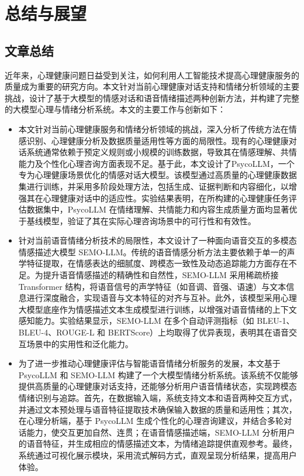 
\chapter{总结与展望}

\section{文章总结}

近年来，心理健康问题日益受到关注，如何利用人工智能技术提高心理健康服务的质量成为重要的研究方向。本文针对当前心理健康对话支持和情绪分析领域的主要挑战，设计了基于大模型的情感对话和语音情绪描述两种创新方法，并构建了完整的大模型心理与情绪分析系统。本文的主要工作与创新如下：

\begin{itemize}
  \item 本文针对当前心理健康服务和情绪分析领域的挑战，深入分析了传统方法在情感识别、心理健康分析及数据质量适用性等方面的局限性。现有的心理健康对话系统通常依赖于预定义规则或小规模的训练数据，导致其在情感理解、共情能力及个性化心理咨询方面表现不足。基于此，本文设计了PsycoLLM，一个专为心理健康场景优化的情感对话大模型。该模型通过高质量的心理健康数据集进行训练，并采用多阶段处理方法，包括生成、证据判断和内容细化，以增强其在心理健康对话中的适应性。实验结果表明，在所构建的心理健康任务评估数据集中，PsycoLLM 在情绪理解、共情能力和内容生成质量方面均显著优于基线模型，验证了其在实际心理咨询场景中的可行性和有效性。
  \item 针对当前语音情绪分析技术的局限性，本文设计了一种面向语音交互的多模态情感描述大模型 SEMO-LLM。传统的语音情感分析方法主要依赖于单一的声学特征提取，在情感表达的细腻度、跨模态一致性及动态追踪能力方面存在不足。为提升语音情感描述的精确性和自然性，SEMO-LLM 采用稀疏桥接 Transformer 结构，将语音信号的声学特征（如音调、音强、语速）与文本信息进行深度融合，实现语音与文本特征的对齐与互补。此外，该模型采用心理大模型底座作为情感描述文本生成模型进行训练，以增强对语音情绪的上下文感知能力。实验结果显示，SEMO-LLM 在多个自动评测指标（如 BLEU-1、BLEU-4、ROUGE-L 和 BERTScore）上均取得了优异表现，表明其在语音交互场景中的实用性和泛化能力。
  \item 为了进一步推动心理健康评估与智能语音情绪分析服务的发展，本文基于 PsycoLLM 和 SEMO-LLM 构建了一个大模型情绪分析系统。该系统不仅能够提供高质量的心理健康对话支持，还能够分析用户语音情绪状态，实现跨模态情绪识别与追踪。首先，在数据输入端，系统支持文本和语音两种交互方式，并通过文本预处理与语音特征提取技术确保输入数据的质量和适用性；其次，在心理分析端，基于 PsycoLLM 生成个性化的心理咨询建议，并结合多轮对话能力，使交互更加自然、连贯；在语音情感描述端，SEMO-LLM 分析用户的语音特征，并生成相应的情感描述文本，为情绪追踪提供直观参考。最终，系统通过可视化展示模块，采用流式解码方式，直观呈现分析结果，提高用户体验。
\end{itemize}

